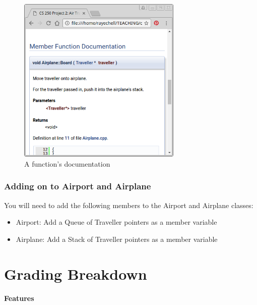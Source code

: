 \documentclass[a4paper,12pt,oneside]{book}
\begin{document}
    \begin{figure}[h]
        \center
        \includegraphics[height=8cm]{images/project2-functions.png}
        \caption{A function's documentation}
    \end{figure}

    \subsection{Adding on to Airport and Airplane}

    You will need to add the following members to the Airport and Airplane classes:

    \begin{itemize}
        \item Airport: Add a Queue of Traveller pointers as a member variable
        \item Airplane: Add a Stack of Traveller pointers as a member variable
    \end{itemize}

    \chapter*{Grading Breakdown}

    \textbf{Features}
\end{document}
